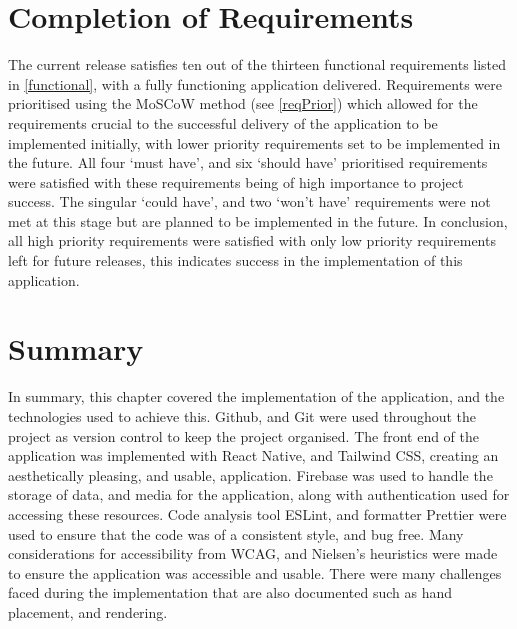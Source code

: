 \section{Completion of Requirements}
The current release satisfies ten out of the thirteen functional requirements listed in \ref{functional}, with a fully functioning application delivered. Requirements were prioritised using the MoSCoW method (see \ref{reqPrior}) which allowed for the requirements crucial to the successful delivery of the application to be implemented initially, with lower priority requirements set to be implemented in the future. All four `must have', and six `should have' prioritised requirements were satisfied with these requirements being of high importance to project success. The singular `could have', and two `won't have' requirements were not met at this stage but are planned to be implemented in the future. In conclusion, all high priority requirements were satisfied with only low priority requirements left for future releases, this indicates success in the implementation of this application.


\section{Summary}

In summary, this chapter covered the implementation of the application, and the technologies used to achieve this. Github, and Git were used throughout the project as version control to keep the project organised. The front end of the application was implemented with React Native, and Tailwind CSS, creating an aesthetically pleasing, and usable, application. Firebase was used to handle the storage of data, and media for the application, along with authentication used for accessing these resources. Code analysis tool ESLint, and formatter Prettier were used to ensure that the code was of a consistent style, and bug free. Many considerations for accessibility from WCAG, and Nielsen's heuristics were made to ensure the application was accessible and usable. There were many challenges faced during the implementation that are also documented such as hand placement, and rendering.